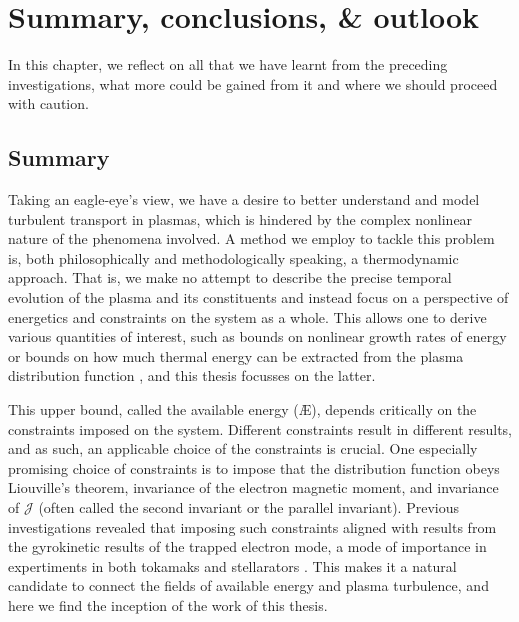 \chapter{Summary, conclusions, \& outlook}
\vspace*{3mm}
In this chapter, we reflect on all that we have learnt from the preceding investigations, what more could be gained from it and where we should proceed with caution. 
\section{Summary}
Taking an eagle-eye's view, we have a desire to better understand and model turbulent transport in plasmas, which is hindered by the complex nonlinear nature of the phenomena involved. A method we employ to tackle this problem is, both philosophically and methodologically speaking, a thermodynamic approach. That is, we make no attempt to describe the precise temporal evolution of the plasma and its constituents and instead focus on a perspective of energetics and constraints on the system as a whole. This allows one to derive various quantities of interest, such as bounds on nonlinear growth rates of energy \cite{helander2022energetic,plunk2022energetic,plunk2023energetic} or bounds on how much thermal energy can be extracted from the plasma distribution function \cite{gardner1963bound,helander2017available,kolmes2020recovering,helander2020available}, and this thesis focusses on the latter. \par 
This upper bound, called the available energy (\AE{}), depends critically on the constraints imposed on the system. Different constraints result in different results, and as such, an applicable choice of the constraints is crucial. One especially promising choice of constraints is to impose that the distribution function obeys Liouville's theorem, invariance of the electron magnetic moment, and invariance of $\mathcal{J}$ (often called the second invariant or the parallel invariant). Previous investigations revealed that imposing such constraints aligned with results from the gyrokinetic results of the trapped electron mode, a mode of importance in expertiments in both tokamaks and stellarators \cite{rewoldt2005comparison,guttenfelder2008effect,fable2009role}. This makes it a natural candidate to connect the fields of available energy and plasma turbulence, and here we find the inception of the work of this thesis. \par 
